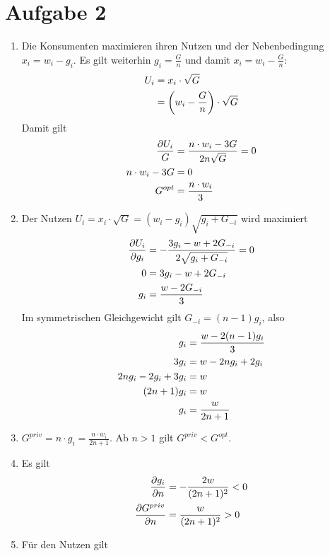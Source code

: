 \documentclass{article}
\begin{document}
	\section*{Aufgabe 2}
	\begin{enumerate}[label=(\alph*)]
		\item Die Konsumenten maximieren ihren Nutzen und der Nebenbedingung $x_i=w_i-g_i$. Es gilt weiterhin $g_i=\frac{G}{n}$ und damit $x_i=w_i-\frac{G}{n}$:
		\begin{align}
			U_i &= x_i\cdot\sqrt{G} \notag \\
			&= \left(w_i-\frac{G}{n}\right)\cdot\sqrt{G} \notag
		\end{align}
		Damit gilt
		\begin{align}
			\frac{\partial U_i}{G} &= \frac{n\cdot w_i-3G}{2n\sqrt{G}} = 0 \notag \\
			n\cdot w_i - 3G &= 0 \notag \\
			G^{opt} &= \frac{n\cdot w_i}{3} \notag
		\end{align}
		\item Der Nutzen $U_i=x_i\cdot\sqrt{G}=(w_i-g_i)\sqrt{g_i+G_{-i}}$ wird maximiert
		\begin{align}
			\frac{\partial U_i}{\partial g_i} &= -\frac{3g_i - w + 2G_{-i}}{2\sqrt{g_i+G_{-i}}} =0 \notag \\
			0 &= 3g_i - w + 2G_{-i} \notag \\
			g_i &= \frac{w-2G_{-i}}{3} \notag
		\end{align}
		Im symmetrischen Gleichgewicht gilt $G_{-i}=(n-1)g_i$, also
		\begin{align}
			g_i &= \frac{w-2(n-1)g_i}{3} \notag \\
			3g_i &= w-2ng_i + 2g_i \notag \\
			2ng_i - 2g_i + 3g_i &= w \notag \\
			(2n+1)g_i &= w \notag \\
			g_i &= \frac{w}{2n+1} \notag
		\end{align}
		\item $G^{priv} = n\cdot g_i = \frac{n\cdot w_i}{2n+1}$. Ab $n>1$ gilt $G^{priv}<G^{opt}$.
		\item Es gilt
		\begin{align}
			\frac{\partial g_i}{\partial n} &= -\frac{2w}{(2n+1)^2} < 0 \notag \\
			\frac{\partial G^{priv}}{\partial n} &= \frac{w}{(2n+1)^2} > 0 \notag
		\end{align}
		\item Für den Nutzen gilt
		\begin{align}

\end{align}
\end{enumerate}
\end{document}
